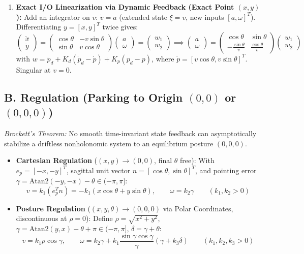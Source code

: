 \documentclass[10pt, a4paper]{article}
\begin{document}
\begin{enumerate}
    \item \textbf{Exact I/O Linearization via Dynamic Feedback (Exact Point $(x,y)$):}
    Add an integrator on $v$: $\dot{v} = a$ (extended state $\xi = v$, new inputs $[a, \omega]^T$). Differentiating $y = [x,y]^T$ twice gives:
    \[
        \begin{pmatrix} \ddot{x} \\ \ddot{y} \end{pmatrix} = \begin{pmatrix} \cos\theta & -v\sin\theta \\ \sin\theta & v\cos\theta \end{pmatrix} \begin{pmatrix} a \\ \omega \end{pmatrix} = \begin{pmatrix} w_1 \\ w_2 \end{pmatrix} \implies \begin{pmatrix} a \\ \omega \end{pmatrix} = \begin{pmatrix} \cos\theta & \sin\theta \\ -\frac{\sin\theta}{v} & \frac{\cos\theta}{v} \end{pmatrix} \begin{pmatrix} w_1 \\ w_2 \end{pmatrix}
    \]
    with $w = \ddot{p}_d + K_d(\dot{p}_d - \dot{p}) + K_p(p_d - p)$, where $\dot{p} = [v\cos\theta, v\sin\theta]^T$. Singular at $v = 0$.
\end{enumerate}

\subsection*{B. Regulation (Parking to Origin $(0,0)$ or $(0,0,0)$)}
\textit{Brockett's Theorem:} No smooth time-invariant state feedback can asymptotically stabilize a driftless nonholonomic system to an equilibrium posture $(0,0,0)$.
\begin{itemize}
    \item \textbf{Cartesian Regulation} ($(x,y) \to (0,0)$, final $\theta$ free):
    With $e_p = [-x, -y]^T$, sagittal unit vector $n = [\cos\theta, \sin\theta]^T$, and pointing error $\gamma = \text{Atan2}(-y, -x) - \theta \in (-\pi, \pi]$:
    \[
        v = k_1 (e_p^T n) = -k_1(x\cos\theta + y\sin\theta), \qquad \omega = k_2 \gamma \qquad (k_1, k_2 > 0)
    \]
    \item \textbf{Posture Regulation} ($(x,y,\theta) \to (0,0,0)$ via Polar Coordinates, discontinuous at $\rho = 0$):
    Define $\rho = \sqrt{x^2 + y^2}$, $\gamma = \text{Atan2}(y, x) - \theta + \pi \in (-\pi, \pi]$, $\delta = \gamma + \theta$:
    \[
        v = k_1 \rho \cos\gamma, \qquad \omega = k_2 \gamma + k_1 \frac{\sin\gamma\cos\gamma}{\gamma}(\gamma + k_3 \delta) \qquad (k_1, k_2, k_3 > 0)
    \]
\end{itemize}
\end{document}
